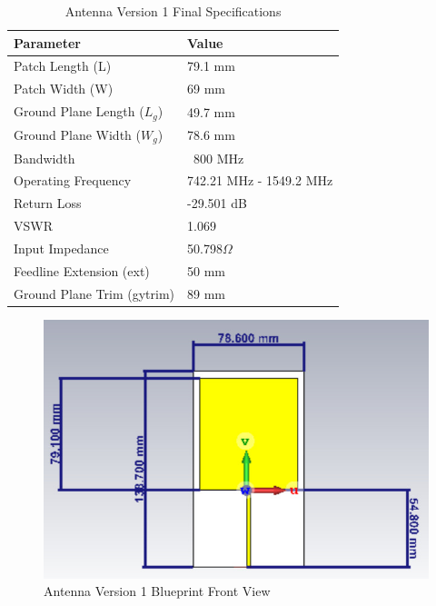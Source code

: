 \documentclass[conference]{IEEEtran}
\begin{document}
\begin{table}
\begin{center}
\caption{Antenna Version 1 Final Specifications}
\label{tab:tab5}
\begin{tabular}{| M{2cm}| M{5cm} |}
    \hline
    \textbf{Parameter} & \textbf{Value} \\ 
    \hline
    Patch Length (L) & 79.1 mm \\
    \hline
    Patch Width (W) & 69 mm\\ 
    \hline
    Ground Plane Length ($L_{g}$) & 49.7 mm\\ 
    \hline
    Ground Plane Width ($W_{g}$) & 78.6 mm\\ 
    \hline
    Bandwidth & ~800 MHz\\ 
    \hline
    Operating Frequency & 742.21 MHz - 1549.2 MHz\\ 
    \hline
    Return Loss & -29.501 dB\\ 
    \hline
    VSWR & 1.069\\ 
    \hline
    Input Impedance & 50.798$\Omega$ \\ 
    \hline
    Feedline Extension (ext) & 50 mm\\ 
    \hline
    Ground Plane Trim (gytrim) & 89 mm\\ 
    \hline
\end{tabular}
\end{center}
\end{table}

\begin{figure}[htbp]
    \centering
    \includegraphics[width=0.9\columnwidth]{dimension-akhir}
    \caption{Antenna Version 1 Blueprint Front View}
    \label{fig3}
\end{figure}
\end{document}
